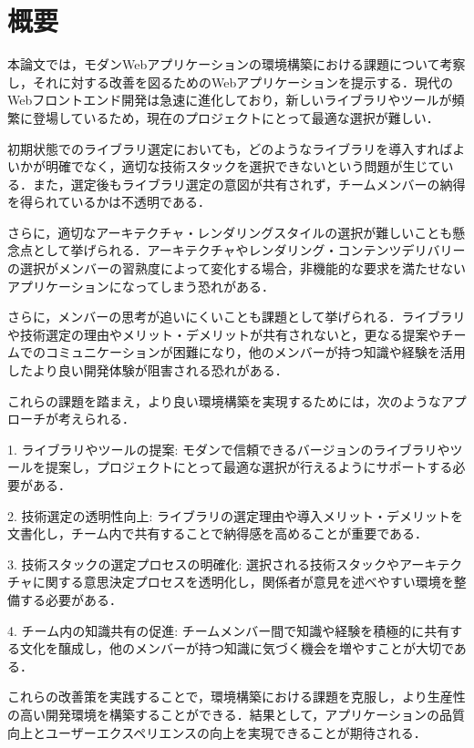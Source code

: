 \documentclass[main]{subfiles}
\begin{document}
\section{概要 }

本論文では，モダンWebアプリケーションの環境構築における課題について考察し，それに対する改善を図るためのWebアプリケーションを提示する．現代のWebフロントエンド開発は急速に進化しており，新しいライブラリやツールが頻繁に登場しているため，現在のプロジェクトにとって最適な選択が難しい．

初期状態でのライブラリ選定においても，どのようなライブラリを導入すればよいかが明確でなく，適切な技術スタックを選択できないという問題が生じている．また，選定後もライブラリ選定の意図が共有されず，チームメンバーの納得を得られているかは不透明である．

さらに，適切なアーキテクチャ・レンダリングスタイルの選択が難しいことも懸念点として挙げられる．アーキテクチャやレンダリング・コンテンツデリバリーの選択がメンバーの習熟度によって変化する場合，非機能的な要求を満たせないアプリケーションになってしまう恐れがある．

さらに，メンバーの思考が追いにくいことも課題として挙げられる．ライブラリや技術選定の理由やメリット・デメリットが共有されないと，更なる提案やチームでのコミュニケーションが困難になり，他のメンバーが持つ知識や経験を活用したより良い開発体験が阻害される恐れがある．

これらの課題を踏まえ，より良い環境構築を実現するためには，次のようなアプローチが考えられる．

1. ライブラリやツールの提案: モダンで信頼できるバージョンのライブラリやツールを提案し，プロジェクトにとって最適な選択が行えるようにサポートする必要がある．

2. 技術選定の透明性向上: ライブラリの選定理由や導入メリット・デメリットを文書化し，チーム内で共有することで納得感を高めることが重要である．

3. 技術スタックの選定プロセスの明確化: 選択される技術スタックやアーキテクチャに関する意思決定プロセスを透明化し，関係者が意見を述べやすい環境を整備する必要がある．

4. チーム内の知識共有の促進: チームメンバー間で知識や経験を積極的に共有する文化を醸成し，他のメンバーが持つ知識に気づく機会を増やすことが大切である．

これらの改善策を実践することで，環境構築における課題を克服し，より生産性の高い開発環境を構築することができる．結果として，アプリケーションの品質向上とユーザーエクスペリエンスの向上を実現できることが期待される．
\end{document}

